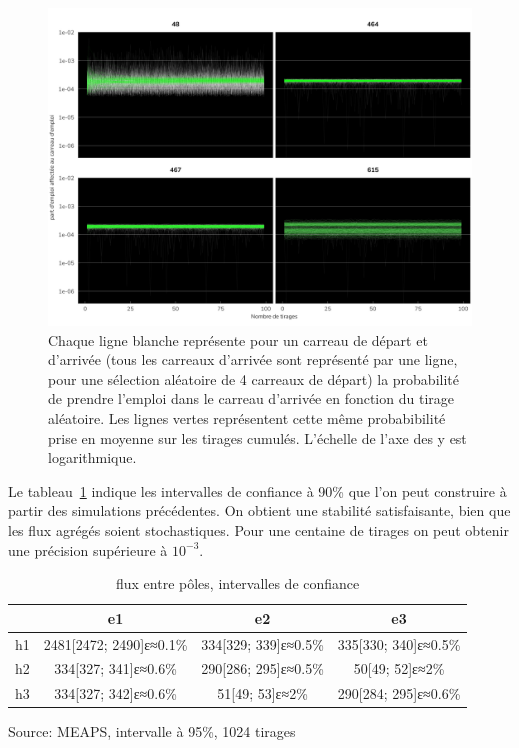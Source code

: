 \documentclass[
  10pt,
  a4paper,
  numbers=noendperiod,
  DIV=9]{scrartcl}
\begin{document}
\begin{figure}[htb]

{\centering \includegraphics[width=1\textwidth,height=\textheight]{output/gemploi_erg.png}

}

\caption[Affectation de l'emploi pour des carreaux de
départ]{\label{fig-emperg}Chaque ligne blanche représente pour un
carreau de départ et d'arrivée (tous les carreaux d'arrivée sont
représenté par une ligne, pour une sélection aléatoire de 4 carreaux de
départ) la probabilité de prendre l'emploi dans le carreau d'arrivée en
fonction du tirage aléatoire. Les lignes vertes représentent cette même
probabibilité prise en moyenne sur les tirages cumulés. L'échelle de
l'axe des y est logarithmique.}

\end{figure}

Le tableau~\ref{tbl-fluxpoles_conf} indique les intervalles de confiance
à 90\% que l'on peut construire à partir des simulations précédentes. On
obtient une stabilité satisfaisante, bien que les flux agrégés soient
stochastiques. Pour une centaine de tirages on peut obtenir une
précision supérieure à \(10^{-3}\).

\hypertarget{tbl-fluxpoles_conf}{}
\setlength{\LTpost}{0mm}
\begin{longtable}{lccc}
\caption{\label{tbl-fluxpoles_conf}flux entre pôles, intervalles de confiance }\tabularnewline

\toprule
 & e1 & e2 & e3 \\ 
\midrule
h1 & 2481{[}2472; 2490{]}ε≈0.1\% & 334{[}329; 339{]}ε≈0.5\% & 335{[}330; 340{]}ε≈0.5\% \\ 
h2 & 334{[}327; 341{]}ε≈0.6\% & 290{[}286; 295{]}ε≈0.5\% & 50{[}49; 52{]}ε≈2\% \\ 
h3 & 334{[}327; 342{]}ε≈0.6\% & 51{[}49; 53{]}ε≈2\% & 290{[}284; 295{]}ε≈0.6\% \\ 
\bottomrule
\end{longtable}
\begin{minipage}{\linewidth}
Source: MEAPS, intervalle à 95\%, 1024 tirages\\
\end{minipage}
\end{document}
